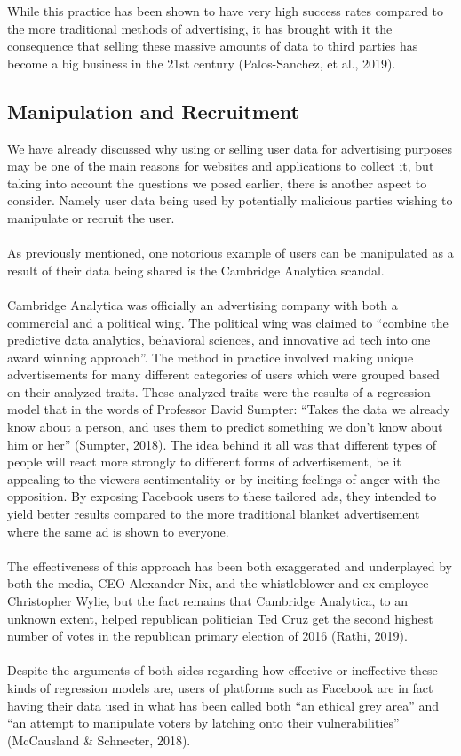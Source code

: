 \documentclass[11pt]{article}
\begin{document}
While this practice has been shown to have very high success rates compared to the more traditional methods of advertising, it has brought with it the consequence that selling these massive amounts of data to third parties has become a big business in the 21st century (Palos-Sanchez, et al., 2019). 

\subsection{Manipulation and Recruitment}
We have already discussed why using or selling user data for advertising purposes may be one of the main reasons for websites and applications to collect it, but taking into account the questions we posed earlier, there is another aspect to consider. Namely user data being used by potentially malicious parties wishing to manipulate or recruit the user.\\ \\ 

As previously mentioned, one notorious example of users can be manipulated as a result of their data being shared is the Cambridge Analytica scandal. \\ \\

Cambridge Analytica was officially an advertising company with both a commercial and a political wing. The political wing was claimed to “combine the predictive data analytics, behavioral sciences, and innovative ad tech into one award winning approach”. The method in practice involved making unique advertisements for many different categories of users which were grouped based on their analyzed traits. These analyzed traits were the results of a regression model that in the words of Professor David Sumpter: “Takes the data we already know about a person, and uses them to predict something we don’t know about him or her” (Sumpter, 2018). The idea behind it all was that different types of people will react more strongly to different forms of advertisement, be it appealing to the viewers sentimentality or by inciting feelings of anger with the opposition. By exposing Facebook users to these tailored ads, they intended to yield better results compared to the more traditional blanket advertisement where the same ad is shown to everyone.  
\\ \\
The effectiveness of this approach has been both exaggerated and underplayed by both the media, CEO Alexander Nix, and the whistleblower and ex-employee Christopher Wylie, but the fact remains that Cambridge Analytica, to an unknown extent, helped republican politician Ted Cruz get the second highest number of votes in the republican primary election of 2016 (Rathi, 2019). 
\\ \\
Despite the arguments of both sides regarding how effective or ineffective these kinds of regression models are, users of platforms such as Facebook are in fact having their data used in what has been called both “an ethical grey area” and “an attempt to manipulate voters by latching onto their vulnerabilities” (McCausland \& Schnecter, 2018). \\ \\
\end{document}
